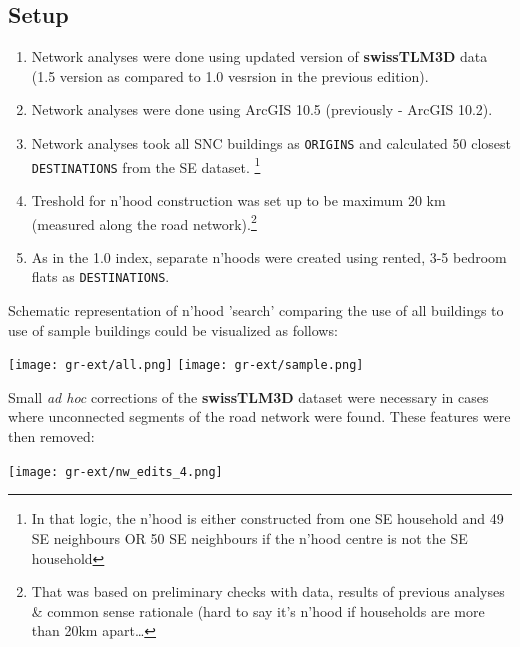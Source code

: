 \documentclass[a4paper, notitlepage, fleqn]{article} %
\begin{document}
\subsection{Setup}

\begin{enumerate}

	\item Network analyses were done using updated version of \textbf{swissTLM3D} data 
		(1.5 version as compared to 1.0 vesrsion in the previous edition).
	
	\item Network analyses were done using ArcGIS 10.5 (previously - ArcGIS 10.2).
	
	\item Network analyses took all SNC buildings as \texttt{ORIGINS} and calculated 
		50 closest \texttt{DESTINATIONS} from the SE dataset.
		\footnote{In that logic, the n'hood is either constructed from one SE household and 49 SE neighbours 
		OR 50 SE neighbours if the n'hood centre is not the SE household}		
	
	\item Treshold for n'hood construction was set up to be maximum 20 km (measured along the road network).\footnote{That was based 
		on preliminary checks with data, results of previous analyses \& common sense rationale (hard to say it's n'hood if households are more than 20km apart\ldots}
	
	\item As in the 1.0 index, separate n'hoods were created using rented, 3-5 bedroom flats as \texttt{DESTINATIONS}. 

\end{enumerate}

Schematic representation of n'hood 'search' comparing the use of all buildings to use of sample buildings could be visualized as follows: 

\begin{center}
\texttt{[image: gr-ext/all.png]}
\texttt{[image: gr-ext/sample.png]} 
\end{center}

Small \textit{ad hoc} corrections of the \textbf{swissTLM3D} dataset were necessary in cases where unconnected segments of the road network were found. These features were then removed: 

\begin{center}
\texttt{[image: gr-ext/nw\_edits\_4.png]}
\end{center}
\end{document}
